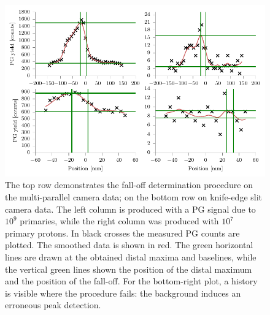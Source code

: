 \documentclass[a4paper,english]{article}
\begin{document}
\begin{appendices}
\begin{figure}[htp]
  \centering
  \includegraphics[width=0.9\linewidth]{fopproc}
  \caption{The top row demonstrates the fall-off determination procedure on the multi-parallel camera data; on the bottom row on knife-edge slit camera data. The left column is produced with a PG signal due to $10^9$ primaries, while the right column was produced with $10^7$ primary protons. In black crosses the measured PG counts are plotted. The smoothed data is shown in red. The green horizontal lines are drawn at the obtained distal maxima and baselines, while the vertical green lines shown the position of the distal maximum and the position of the fall-off. For the bottom-right plot, a history is visible where the procedure fails: the background induces an erroneous peak detection.}
  \label{fig:our-fit}
\end{figure}

\end{appendices}
\newpage




\end{document}
